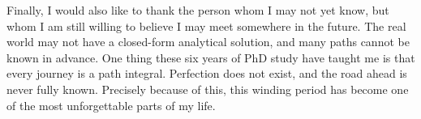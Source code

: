 Finally, I would also like to thank the person whom I may not yet know,
but whom I am still willing to believe I may meet somewhere in the future.
The real world may not have a closed-form analytical solution, and many paths cannot be known in advance.
One thing these six years of PhD study have taught me is that every journey is a path integral.
Perfection does not exist, and the road ahead is never fully known.
Precisely because of this, this winding period has become one of the most unforgettable parts of my life.
